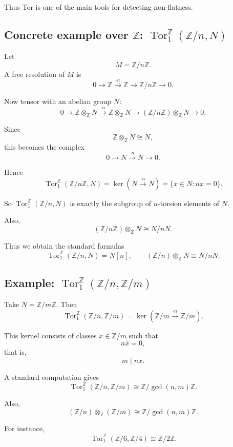 \documentclass[12pt,a4paper]{article}
\theoremstyle{notespace}
\begin{document}
Thus Tor is one of the main tools for detecting non-flatness.

\subsection{Concrete example over \(\mathbb Z\): \(\operatorname{Tor}_1^{\mathbb Z}(\mathbb Z/n,N)\)}

Let
\[
M=\mathbb Z/n\mathbb Z.
\]
A free resolution of \(M\) is
\[
0\to \mathbb Z \xrightarrow{\cdot n} \mathbb Z \to \mathbb Z/n\mathbb Z \to 0.
\]

Now tensor with an abelian group \(N\):
\[
0\to \mathbb Z\otimes_{\mathbb Z} N
\xrightarrow{\cdot n}
\mathbb Z\otimes_{\mathbb Z} N
\to
(\mathbb Z/n\mathbb Z)\otimes_{\mathbb Z} N
\to 0.
\]

Since
\[
\mathbb Z\otimes_{\mathbb Z} N \cong N,
\]
this becomes the complex
\[
0\to N \xrightarrow{\cdot n} N \to 0.
\]

Hence
\[
\operatorname{Tor}_1^{\mathbb Z}(\mathbb Z/n\mathbb Z,N)
=
\ker(N\xrightarrow{\cdot n}N)
=
\{x\in N: nx=0\}.
\]

So \(\operatorname{Tor}_1^{\mathbb Z}(\mathbb Z/n,N)\) is exactly the subgroup of \(n\)-torsion elements of \(N\).

Also,
\[
(\mathbb Z/n\mathbb Z)\otimes_{\mathbb Z} N
\cong
N/nN.
\]

Thus we obtain the standard formulas
\[
\operatorname{Tor}_1^{\mathbb Z}(\mathbb Z/n,N)=N[n],
\qquad
(\mathbb Z/n)\otimes_{\mathbb Z}N\cong N/nN.
\]

\subsection{Example: \(\operatorname{Tor}_1^{\mathbb Z}(\mathbb Z/n,\mathbb Z/m)\)}

Take \(N=\mathbb Z/m\mathbb Z\). Then
\[
\operatorname{Tor}_1^{\mathbb Z}(\mathbb Z/n,\mathbb Z/m)
=
\ker(\mathbb Z/m \xrightarrow{\cdot n}\mathbb Z/m).
\]

This kernel consists of classes \(\overline{x}\in \mathbb Z/m\) such that
\[
n\overline{x}=0,
\]
that is,
\[
m \mid nx.
\]

A standard computation gives
\[
\operatorname{Tor}_1^{\mathbb Z}(\mathbb Z/n,\mathbb Z/m)
\cong
\mathbb Z/\gcd(n,m)\mathbb Z.
\]

Also,
\[
(\mathbb Z/n)\otimes_{\mathbb Z}(\mathbb Z/m)
\cong
\mathbb Z/\gcd(n,m)\mathbb Z.
\]

For instance,
\[
\operatorname{Tor}_1^{\mathbb Z}(\mathbb Z/6,\mathbb Z/4)\cong \mathbb Z/2\mathbb Z.
\]
\end{document}
